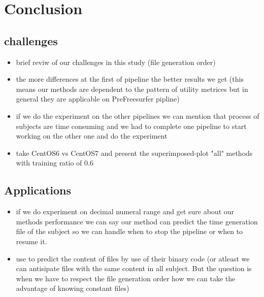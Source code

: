 \chapter{Conclusion}
\section{challenges}
\begin{tcolorbox}
        \begin{itemize}
                \item brief reviw of our challenges in this study (file generation order)
                \item the more differences at the first of pipeline the better results we get
                (this means our methods are dependent to the pattern of utility metrices but in general they are applicable on PreFreesurfer pipline)
                \item if we do the experiment on the other pipelines we can mention that process
                of subjects are time consuming and we had to complete one pipeline to start working on the other one and do the experiment
                \item take CentOS6 vs CentOS7 and present the superimposed-plot "all" methods with training ratio of 0.6
\end{itemize}
\end{tcolorbox}
\section{Applications}
\begin{tcolorbox}
        \begin{itemize}
                \item if we do experiment on decimal numeral range and get sure about our methods
                performance we can say our method can predict the time generation file of the subject
                so we can handle when to stop the pipeline or when to resume it.
                \item use to predict the content of files by use of their binary code
                (or atleast we can antisipate files with the same content in all subject.
                But the question is when we have to respect the file generation order how we can take the advantage of knowing constant files)
\end{itemize}
\end{tcolorbox}
